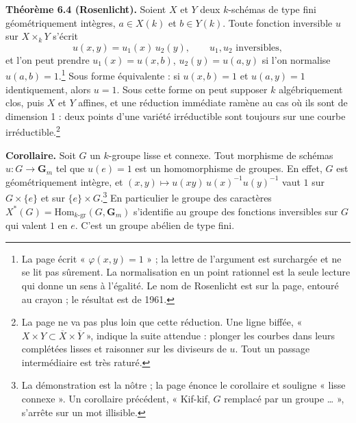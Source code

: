 \documentclass[11pt,a4paper]{article}
\begin{document}
\textbf{Théorème 6.4 (Rosenlicht).} Soient $X$ et $Y$ deux $k$-schémas de
type fini géométriquement intègres, $a \in X(k)$ et $b \in Y(k)$. Toute
fonction inversible $u$ sur $X \times_{k} Y$ s'écrit
\[
  u(x, y) = u_{1}(x)\, u_{2}(y), \qquad u_{1}, u_{2} \text{ inversibles},
\]
et l'on peut prendre $u_{1}(x) = u(x, b)$, $u_{2}(y) = u(a, y)$ si l'on
normalise $u(a, b) = 1$.\footnote{La page écrit « $\varphi(x,y) = 1$ » ; la
lettre de l'argument est surchargée et ne se lit pas sûrement. La
normalisation en un point rationnel est la seule lecture qui donne un sens à
l'égalité. Le nom de Rosenlicht est sur la page, entouré au crayon ; le
résultat est de 1961.} Sous forme équivalente : si $u(x, b) = 1$ et
$u(a, y) = 1$ identiquement, alors $u = 1$. Sous cette forme on peut supposer
$k$ algébriquement clos, puis $X$ et $Y$ affines, et une réduction immédiate
ramène au cas où ils sont de dimension 1 : deux points d'une variété
irréductible sont toujours sur une courbe irréductible.\footnote{La page ne va
pas plus loin que cette réduction. Une ligne biffée,
« $X \times Y \subset \overline{X} \times \overline{Y}$ », indique la suite
attendue : plonger les courbes dans leurs complétées lisses et raisonner sur
les diviseurs de $u$. Tout un passage intermédiaire est très raturé.}

\textbf{Corollaire.} Soit $G$ un $k$-groupe lisse et connexe. Tout morphisme de
schémas $u : G \to \mathbf{G}_{m}$ tel que $u(e) = 1$ est un homomorphisme de
groupes. En effet, $G$ est géométriquement intègre, et
$(x, y) \mapsto u(xy)\, u(x)^{-1} u(y)^{-1}$ vaut $1$ sur $G \times \{e\}$ et
sur $\{e\} \times G$.\footnote{La démonstration est la nôtre ; la page énonce
le corollaire et souligne « lisse connexe ». Un corollaire précédent,
« Kif-kif, $G$ remplacé par un groupe … », s'arrête sur un mot illisible.} En particulier le
groupe des caractères $X^{*}(G) = \mathrm{Hom}_{k\text{-gr}}(G, \mathbf{G}_{m})$
s'identifie au groupe des fonctions inversibles sur $G$ qui valent $1$ en
$e$. C'est un groupe abélien de type fini.
\end{document}

